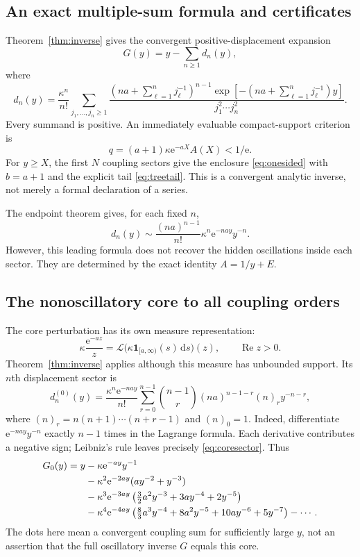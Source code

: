 \documentclass[11pt,a4paper]{article}
\theoremstyle{definition}
\theoremstyle{remark}
\newcommand{\Lap}{\mathcal L}
\newcommand{\dd}{\,\mathrm d}
\newcommand{\e}{\mathrm e}
\newcommand{\Rea}{\operatorname{Re}}
\newcommand{\rise}[2]{(#1)_{#2}}
\numberwithin{equation}{section}
\begin{document}
\subsection{An exact multiple-sum formula and certificates}
Theorem~\ref{thm:inverse} gives the convergent positive-displacement expansion
\begin{equation}\label{eq:Gdn}
 G(y)=y-\sum_{n\ge1}d_n(y),
\end{equation}
where
\begin{equation}\label{eq:multiple}
 d_n(y)=\frac{\kappa^n}{n!}
 \sum_{j_1,\ldots,j_n\ge1}
 \frac{\left(na+\sum_{\ell=1}^n j_\ell^{-1}\right)^{n-1}
       \exp\left[-\left(na+\sum_{\ell=1}^n j_\ell^{-1}\right)y\right]}
      {j_1^2\cdots j_n^2}.
\end{equation}
Every summand is positive. An immediately evaluable compact-support criterion is
\begin{equation}\label{eq:modelcriterion}
 q=(a+1)\kappa\e^{-aX}A(X)<1/\e.
\end{equation}
For $y\ge X$, the first $N$ coupling sectors give the enclosure \eqref{eq:onesided} with $b=a+1$ and the explicit tail \eqref{eq:treetail}. This is a convergent analytic inverse, not merely a formal declaration of a series.

The endpoint theorem gives, for each fixed $n$,
\[
 d_n(y)\sim\frac{(na)^{n-1}}{n!}
              \kappa^n\e^{-nay}y^{-n}.
\]
However, this leading formula does not recover the hidden oscillations inside each sector. They are determined by the exact identity $A=1/y+E$.

\subsection{The nonoscillatory core to all coupling orders}
The core perturbation has its own measure representation:
\[
 \kappa\frac{\e^{-az}}z=\Lap\bigl(\kappa\mathbf1_{[a,\infty)}(s)\dd s\bigr)(z),
 \qquad\Rea z>0.
\]
Theorem~\ref{thm:inverse} applies although this measure has unbounded support. Its $n$th displacement sector is
\begin{equation}\label{eq:coresector}
 d_n^{(0)}(y)=\frac{\kappa^n\e^{-nay}}{n!}
 \sum_{r=0}^{n-1}\binom{n-1}{r}(na)^{n-1-r}\rise{n}{r}y^{-n-r},
\end{equation}
where $\rise{n}{r}=n(n+1)\cdots(n+r-1)$ and $\rise{n}{0}=1$.
Indeed, differentiate $\e^{-nay}y^{-n}$ exactly $n-1$ times in the Lagrange formula. Each derivative contributes a negative sign; Leibniz's rule leaves precisely \eqref{eq:coresector}. Thus
\begin{align}\label{eq:corefirst}
 G_0(y)=y
 &-\kappa\e^{-ay}y^{-1}\\
 &-\kappa^2\e^{-2ay}(ay^{-2}+y^{-3})\notag\\
 &-\kappa^3\e^{-3ay}
    \left(\tfrac32a^2y^{-3}+3ay^{-4}+2y^{-5}\right)\notag\\
 &-\kappa^4\e^{-4ay}
    \left(\tfrac83a^3y^{-4}+8a^2y^{-5}+10ay^{-6}+5y^{-7}\right)
 -\cdots.\notag
\end{align}
The dots here mean a convergent coupling sum for sufficiently large $y$, not an assertion that the full oscillatory inverse $G$ equals this core.
\end{document}
